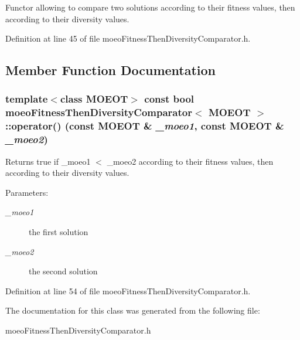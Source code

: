 Functor allowing to compare two solutions according to their fitness values, then according to their diversity values. 



Definition at line 45 of file moeo\-Fitness\-Then\-Diversity\-Comparator.h.

\subsection{Member Function Documentation}
\subsubsection{\setlength{\rightskip}{0pt plus 5cm}template$<$class MOEOT$>$ const bool \bf{moeo\-Fitness\-Then\-Diversity\-Comparator}$<$ MOEOT $>$::operator() (const MOEOT \& {\em \_\-moeo1}, const MOEOT \& {\em \_\-moeo2})\hspace{0.3cm}{\tt  [inline]}}\label{classmoeoFitnessThenDiversityComparator_087856d1a7d81f242e95591d694e3ef6}


Returns true if \_\-moeo1 $<$ \_\-moeo2 according to their fitness values, then according to their diversity values. 

\begin{Desc}
\item[Parameters:]
\begin{description}
\item[{\em \_\-moeo1}]the first solution \item[{\em \_\-moeo2}]the second solution \end{description}
\end{Desc}


Definition at line 54 of file moeo\-Fitness\-Then\-Diversity\-Comparator.h.

The documentation for this class was generated from the following file:\begin{CompactItemize}
\item 
moeo\-Fitness\-Then\-Diversity\-Comparator.h\end{CompactItemize}
